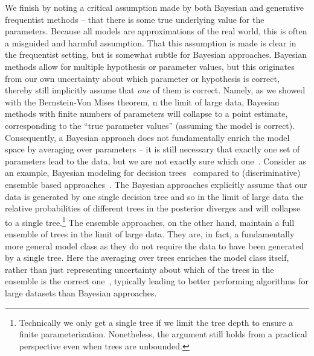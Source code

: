 We finish by noting a critical assumption made by both Bayesian and generative frequentist methods --
that there is some true underlying value for the parameters.  Because
all models are approximations of the real world, this is often a misguided and harmful assumption.  That this assumption
is made is clear in the frequentist setting, but is somewhat subtle for Bayesian approaches.
Bayesian methods allow for multiple hypothesis or parameter values, but this originates from our own uncertainty
about which parameter or hypothesis is correct, thereby still implicitly assume that \emph{one} of them is correct.
Namely, as we showed with the Bernstein-Von Mises theorem,  n the limit of large data, Bayesian methods with finite numbers of parameters will collapse to a point estimate, 
corresponding to the ``true parameter values'' (assuming the model is correct).
Consequently, a Bayesian approach does not fundamentally enrich the model space by averaging over parameters -- it
is still necessary that exactly one set of parameters lead to the data, but we are not exactly sure which one~\citep{minka2000bayesian}.
Consider as an example, Bayesian modeling for decision trees~\cite{chipman1998bayesian,lakshminarayanan2013top}
compared to (discriminative) ensemble based approaches~\citep{breiman2001random,rainforth2015canonical}.
The Bayesian approaches explicitly assume that our data is generated by one single decision tree and so in the limit of
large data the relative probabilities of different trees in the posterior diverges and will collapse to a
single tree.\footnote{Technically we only get a single tree 
	if we limit the tree depth to ensure a finite parameterization.  Nonetheless, the argument still
	holds from a practical perspective even when trees are unbounded.}  The ensemble approaches, on the other hand, maintain
a full ensemble of trees in the limit of large data.  They are, in fact, a fundamentally more general model class
as they do not require the data to have been generated by a single tree.  Here the averaging over trees enriches the
model class itself, rather than just representing uncertainty about which of the trees in the ensemble is the correct 
one~\citep{domingos1997does}, typically leading to better performing algorithms for large datasets than Bayesian approaches.